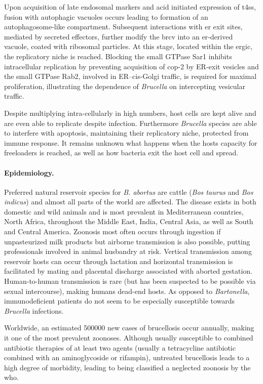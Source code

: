 Upon acquisition of late endosomal markers and acid initiated expression of \gls{t4ss}, fusion with autophagic vacuoles occurs leading to formation of an autophagosome-like compartment. Subsequent interactions with \gls{er} exit sites, mediated by secreted effectors, further modify the \gls{brcv} into an \gls{er}-derived vacuole, coated with ribosomal particles. At this stage, located within the \gls{ergic}, the replicatory niche is reached. Blocking the small GTPase Sar1 inhibits intracellular replication by preventing acquisition of \gls{cop-2} by ER-exit vesicles and the small GTPase Rab2, involved in ER--cis-Golgi traffic, is required for maximal proliferation, illustrating the dependence of \textit{Brucella} on intercepting vesicular traffic.

Despite multiplying intra-cellularly in high numbers, host cells are kept alive and are even able to replicate despite infection. Furthermore \textit{Brucella} species are able to interfere with apoptosis, maintaining their replicatory niche, protected from immune response. It remains unknown what happens when the hosts capacity for freeloaders is reached, as well as how bacteria exit the host cell and spread.

\paragraph{Epidemiology.}
Preferred natural reservoir species for \textit{B. abortus} are cattle (\textit{Bos taurus} and \textit{Bos indicus}) and almost all parts of the world are affected. The disease exists in both domestic and wild animals and is most prevalent in Mediterranean countries, North Africa, throughout the Middle East, India, Central Asia, as well as South and Central America. Zoonosis most often occurs through ingestion if unpasteurized milk products but airborne transmission is also possible, putting professionals involved in animal husbandry at risk. Vertical transmission among reservoir hosts can occur through lactation and horizontal transmission is facilitated by mating and placental discharge associated with aborted gestation. Human-to-human transmission is rare (but has been suspected to be possible via sexual intercourse), making humans dead-end hosts. As opposed to \textit{Bartonella}, immunodeficient patients do not seem to be especially susceptible towards \textit{Brucella} infections.

Worldwide, an estimated 500000 new cases of brucellosis occur annually, making it one of the most prevalent zoonoses. Although usually susceptible to combined antibiotic therapies of at least two agents (usually a tetracycline antibiotic combined with an aminoglycoside or rifampin), untreated brucellosis leads to a high degree of morbidity, leading to being classified a neglected zoonosis by the \gls{who}.

